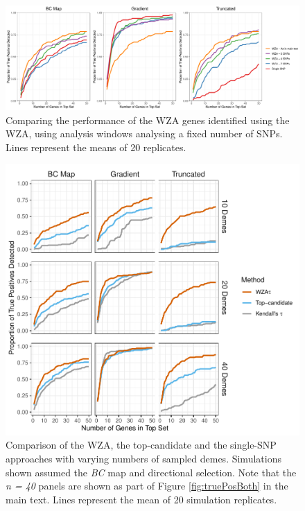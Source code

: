 \documentclass[10pt,twoside,lineno]{GSA_format}
\begin{document}
\begin{figure}[H]
  \includegraphics[width = \textwidth,keepaspectratio]{Plots/SNP_number.pdf}
  \caption{Comparing the performance of the WZA genes identified using the WZA, using analysis windows analysing a fixed number of SNPs. Lines represent the means of 20 replicates.}

  \label{fig:demoPlots}
\end{figure}

\pagebreak


\begin{figure}[H]
  \includegraphics[width = \textwidth,keepaspectratio]{Plots/SampleSizeComparison.pdf}
  \caption{Comparison of the WZA, the top-candidate and the single-SNP approaches with varying numbers of sampled demes. Simulations shown assumed the \textit{BC} map and directional selection. Note that the \textit{n = 40} panels are shown as part of Figure \ref{fig:truePosBoth} in the main text. Lines represent the mean of 20 simulation replicates.}

  \label{fig:sampleSize_demes}
\end{figure}
\end{document}
